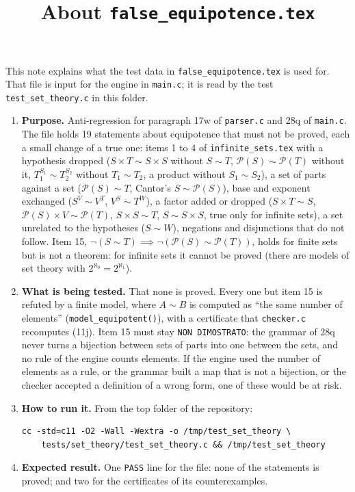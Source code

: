 \documentclass[11pt,a4paper]{article}
\title{About \texttt{false\_equipotence.tex}}
\author{}
\date{}
\begin{document}
\maketitle
This note explains what the test data in \texttt{false\_equipotence.tex} is used for. That file is input for the engine in \texttt{main.c}; it is read by the test \texttt{test\_set\_theory.c} in this folder.

\begin{enumerate}
\item \textbf{Purpose.} Anti-regression for paragraph 17w of \texttt{parser.c} and 28q of \texttt{main.c}. The file holds 19 statements about equipotence that must not be proved, each a small change of a true one: items 1 to 4 of \texttt{infinite\_sets.tex} with a hypothesis dropped ($S \times T \sim S \times S$ without $S \sim T$, $\mathcal{P}(S) \sim \mathcal{P}(T)$ without it, $T_{1}^{S_{1}} \sim T_{2}^{S_{2}}$ without $T_{1} \sim T_{2}$, a product without $S_{1} \sim S_{2}$), a set of parts against a set ($\mathcal{P}(S) \sim T$, Cantor's $S \sim \mathcal{P}(S)$), base and exponent exchanged ($S^{V} \sim V^{T}$, $V^{S} \sim T^{W}$), a factor added or dropped ($S \times T \sim S$, $\mathcal{P}(S) \times V \sim \mathcal{P}(T)$, $S \times S \sim T$, $S \sim S \times S$, true only for infinite sets), a set unrelated to the hypotheses ($S \sim W$), negations and disjunctions that do not follow. Item 15, $\lnot (S \sim T) \implies \lnot (\mathcal{P}(S) \sim \mathcal{P}(T))$, holds for finite sets but is not a theorem: for infinite sets it cannot be proved (there are models of set theory with $2^{\aleph_{0}} = 2^{\aleph_{1}}$).

\item \textbf{What is being tested.} That none is proved. Every one but item 15 is refuted by a finite model, where $A \sim B$ is computed as ``the same number of elements'' (\texttt{model\_equipotent()}), with a certificate that \texttt{checker.c} recomputes (11j). Item 15 must stay \texttt{NON DIMOSTRATO}: the grammar of 28q never turns a bijection between sets of parts into one between the sets, and no rule of the engine counts elements. If the engine used the number of elements as a rule, or the grammar built a map that is not a bijection, or the checker accepted a definition of a wrong form, one of these would be at risk.

\item \textbf{How to run it.} From the top folder of the repository:
\begin{verbatim}
cc -std=c11 -O2 -Wall -Wextra -o /tmp/test_set_theory \
    tests/set_theory/test_set_theory.c && /tmp/test_set_theory
\end{verbatim}

\item \textbf{Expected result.} One \texttt{PASS} line for the file: none of the statements is proved; and two for the certificates of its counterexamples.
\end{enumerate}
\end{document}
